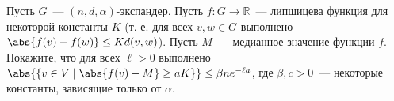 Пусть $G$~--- $(n, d, \alpha)$-экспандер. Пусть $f\colon G \rightarrow \mathbb{R}$~--- липшицева функция
для некоторой константы $K$ (т. е. для всех $v, w \in G$ выполнено $\abs{f(v) - f(w)} \le K d(v,
w)$). Пусть $M$~--- медианное значение функции $f$. Покажите, что для всех $\ell > 0$ выполнено $\abs{\{v
\in V \mid \abs{f(v) - M} \ge a K \}} \le \beta n e^{-\ell a}$, где $\beta, c > 0$~--- некоторые константы,
зависящие только от $\alpha$.
